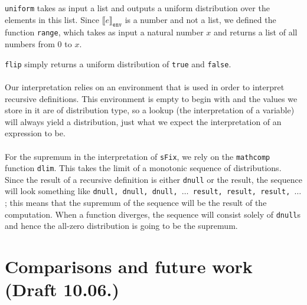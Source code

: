 \documentclass[11pt, leqno, titlepage]{article}
\def\coqe{\lstinline[language=Coq, basicstyle=\small]}
\theoremstyle{definition}
\begin{document}
\texttt{uniform} takes as input a list and outputs a uniform distribution over the
elements in this list. Since $\llbracket e\rrbracket_{\texttt{env}}$ is a number and
not a list, we defined the function \texttt{range}, which takes as input a natural
number $x$ and returns a list of all numbers from 0 to $x$.

\texttt{flip} simply returns a uniform distribution of \texttt{true} and
\texttt{false}. \\
\\
Our interpretation relies on an environment that is used in order to interpret
recursive definitions. This environment is empty to begin with and the values we
store in it are of distribution type, so a lookup (the interpretation of a variable)
will always yield a distribution, just what we expect the interpretation of an
expression to be. \\
\\
For the supremum in the interpretation of \coqe{sFix}, we rely on the
\texttt{mathcomp} function \texttt{dlim}. This takes the limit of a monotonic
sequence of distributions. Since the result of a recursive definition is either
\texttt{dnull} or the result, the sequence will look something like \texttt{dnull,
  dnull, dnull, $\dots$ result, result, result, $\dots$}; this means that the
supremum of the sequence will be the result of the computation. When a function
diverges, the sequence will consist solely of \texttt{dnull}s  and hence the all-zero
distribution is going to be the supremum. 

\section{Comparisons and future work (Draft 10.06.)}

\end{document}
